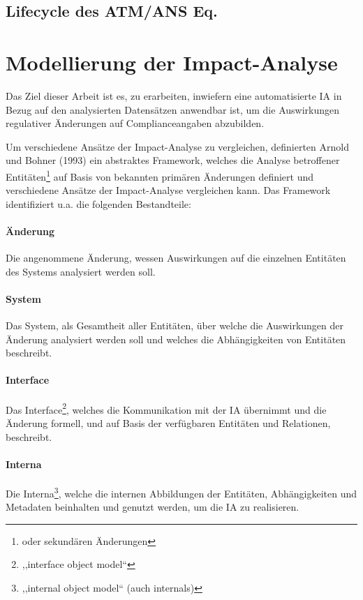 \subsection{Lifecycle des ATM/ANS Eq.}

\pagebreak
\section{Modellierung der Impact-Analyse}

Das Ziel dieser Arbeit ist es, zu erarbeiten, inwiefern eine automatisierte \acf{IA} in Bezug auf den analysierten Datensätzen anwendbar ist, um die Auswirkungen regulativer Änderungen auf Complianceangaben abzubilden.


Um verschiedene Ansätze der Impact-Analyse zu vergleichen, definierten Arnold und Bohner (1993) \cite{app_bohner} ein abstraktes Framework, welches die Analyse betroffener Entitäten\footnote{oder sekundären Änderungen} auf Basis von bekannten primären Änderungen definiert und verschiedene Ansätze der Impact-Analyse vergleichen kann.
\cite[22]{app_lindvall}
Das Framework identifiziert u.a. die folgenden Bestandteile:

\paragraph{Änderung}
    Die angenommene Änderung, wessen Auswirkungen auf die einzelnen Entitäten des Systems analysiert werden soll.

\paragraph{System}
    Das System, als Gesamtheit aller Entitäten, über welche die Auswirkungen der Änderung analysiert werden soll und welches die Abhängigkeiten von Entitäten beschreibt.

\paragraph{Interface}
    Das Interface\footnote{,,interface object model``}, welches die Kommunikation mit der \ac{IA} übernimmt und die Änderung formell, und auf Basis der verfügbaren Entitäten und Relationen, beschreibt. 

\paragraph{Interna}
    Die Interna\footnote{,,internal object model`` (auch internals)}, welche die internen Abbildungen der Entitäten, Abhängigkeiten und Metadaten beinhalten und genutzt werden, um die \ac{IA} zu realisieren.  

